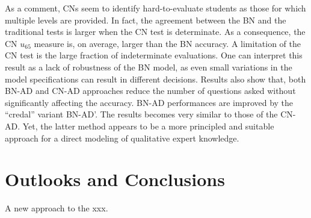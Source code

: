 \documentclass[runningheads]{llncs}
\begin{document}
	
	As a comment, CNs seem to identify hard-to-evaluate students as those for which 
	multiple levels are provided. In fact, the agreement between the BN and the traditional 
	tests is larger when the CN test is determinate. As a consequence, the CN $u_{65}$ 
	measure is, on average, larger than the BN accuracy. 
	A limitation of the CN test is the large fraction of indeterminate evaluations. One can 
	interpret this result as a lack of robustness of the BN model, as even small variations in 
	the model specifications can result in different decisions. Results also show that, both 
	BN-AD and CN-AD approaches reduce the number of questions asked without 
	significantly affecting the accuracy. BN-AD performances are improved by the ``credal'' 
	variant BN-AD'. The results becomes very similar to those of the CN-AD. Yet, the latter 
	method appears to be a more principled and suitable approach for a direct modeling of 
	qualitative expert knowledge. 
	
	
	
	
	
\section{Outlooks and Conclusions}\label{sec:conc}
A new approach to the xxx.


\end{document}

